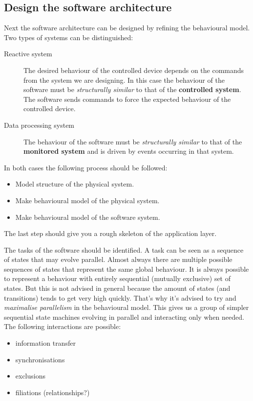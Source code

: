\documentclass[../main.tex]{subfiles}
\begin{document}
\subsection{Design the software architecture}
\label{sss:design}
Next the software architecture can be designed by refining the behavioural model. 
Two types of systems can be distinguished:
\begin{description}
	\item[Reactive system] The desired behaviour of the controlled device depends on the commands from the system we are designing.
		In this case the behaviour of the software must be \emph{structurally similar} to that of the \textbf{controlled system}.
		The software sends commands to force the expected behaviour of the controlled device.
	\item[Data processing system] The behaviour of the software must be \emph{structurally similar} to that of the \textbf{monitored system} and is driven by events occurring in that system.
\end{description}

In both cases the following process should be followed:
\begin{itemize}
	\item Model structure of the physical system. 
	\item Make behavioural model of the physical system.
	\item Make behavioural model of the software system.
\end{itemize}

The last step should give you a rough skeleton of the application layer.

The tasks of the software should be identified.
A task can be seen as a sequence of states that may evolve parallel.
Almost always there are multiple possible sequences of states that represent the same global behaviour.
It is always possible to represent a behaviour with entirely sequential (mutually exclusive) set of states.
But this is not advised in general because the amount of states (and transitions) tends to get very high quickly.
That's why it's advised to try and \emph{maximalise parallelism} in the behavioural model.
This gives us a group of simpler sequential state machines evolving in parallel and interacting only when needed. The following interactions are possible:
\begin{itemize}
	\item information transfer
	\item synchronisations \item exclusions \item filiations (relationships?)
\end{itemize}
\end{document}
